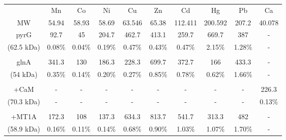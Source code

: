 \begin{tabular}{cccccccccc}
  \toprule
    & Mn & Co & Ni & Cu & Zn & Cd & Hg & Pb & Ca  \\
    MW & 54.94 & 58.93 & 58.69 & 63.546 & 65.38 & 112.411 & 200.592 & 207.2 & 40.078 \\
  \midrule
  pyrG
    & 92.7 & 45 & 204.7 & 462.7 & 413.1 & 259.7 & 669.7 & 387 & - \\
  (62.5 kDa)
    & 0.08\%
    & \cellcolor{lime} 0.04\%
    & \cellcolor{lime} 0.19\%
    & \cellcolor{lime} 0.47\%
    & 0.43\%
    & \cellcolor{lime} 0.47\%
    & \cellcolor{lime} 2.15\%
    & \cellcolor{lime} 1.28\% & - \\
  \\
  glnA
    & 341.3 & 130 & 186.3 & 228.3 & 699.7 & 372.7 & 166 & 433.3 & - \\
  (54 kDa)
    & 0.35\%
    & \cellcolor{lime} 0.14\%
    & \cellcolor{lime} 0.20\%
    & \cellcolor{lime} 0.27\%
    & 0.85\%
    & \cellcolor{lime} 0.78\%
    & \cellcolor{lime} 0.62\%
    & \cellcolor{lime} 1.66\% & - \\
  \\
  +CaM
    & - & - & - & - & - & - & - & - & 226.3 \\
  (70.3 kDa)
    & - & - & - & - & - & - & - & - & 0.13\% \\
  \\
  +MT1A
    & 172.3 & 108 & 137.3 & 634.3 & 813.7 & 541.7 & 313.3 & 482 & - \\
  (58.9 kDa)
    & 0.16\%
    & \cellcolor{lime} 0.11\%
    & \cellcolor{lime} 0.14\%
    & \cellcolor{lime} 0.68\%
    & 0.90\%
    & \cellcolor{lime} 1.03\%
    & \cellcolor{lime} 1.07\%
    & \cellcolor{lime} 1.70\% & - \\
  \bottomrule
\end{tabular}
